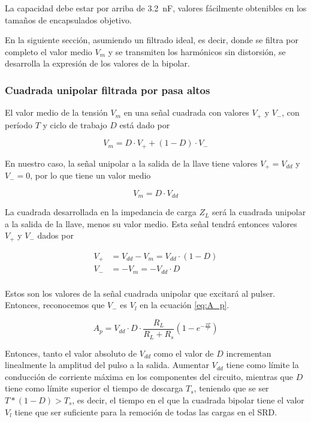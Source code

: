 La capacidad debe estar por arriba de \qty{3.2}{\nano\farad}, valores fácilmente
obtenibles en los tamaños de encapsulados objetivo.

En la siguiente sección, asumiendo un filtrado ideal, es decir, donde se filtra
por completo el valor medio $V_m$ y se transmiten los harmónicos sin distorsión,
se desarrolla la expresión de los valores de la bipolar.

\subsubsection{Cuadrada unipolar filtrada por pasa altos}

El valor medio de la tensión $V_m$ en una señal cuadrada con valores $V_+$ y
$V_-$, con período $T$ y ciclo de trabajo $D$ está dado por

\begin{equation}
    V_m = D \cdot V_+ + (1-D) \cdot V_-
\end{equation}

En nuestro caso, la señal unipolar a la salida de la llave tiene valores
$V_+=V_{dd}$ y $V_-=0$, por lo que tiene un valor medio

\begin{equation}
    V_m = D \cdot V_{dd}
\end{equation}

La cuadrada desarrollada en la impedancia de carga $Z_L$ será la cuadrada
unipolar a la salida de la llave, menos su valor medio. Esta señal tendrá
entonces valores $V_+$ y $V_-$ dados por

\begin{equation}
    \label{eq:square_linear_load_highpassed_values}
    \begin{aligned}
        V_+ &= V_{dd}-V_m = V_{dd} \cdot (1-D) \\
        V_- &= -V_m = -V_{dd} \cdot D \\
    \end{aligned}
\end{equation}

Estos son los valores de la señal cuadrada unipolar que excitará al pulser.
Entonces, reconocemos que $V_-$ es $V_l$ en la ecuación \ref{eq:A_p}.

\begin{equation}
    A_p = V_{dd} \cdot D \cdot \frac{R_L}{R_L+R_s} \left( 1-e^{-\frac{2T}{\tau}}\right)
\end{equation}

Entonces, tanto el valor absoluto de $V_{dd}$ como el valor de $D$ incrementan
linealmente la amplitud del pulso a la salida. Aumentar $V_{dd}$ tiene como
límite la conducción de corriente máxima en los componentes del circuito,
mientras que $D$ tiene como límite superior el tiempo de descarga $T_s$,
teniendo que se ser $T*(1-D) > T_s$, es decir, el tiempo en el que la cuadrada
bipolar tiene el valor $V_l$ tiene que ser suficiente para la remoción de todas
las cargas en el SRD.

